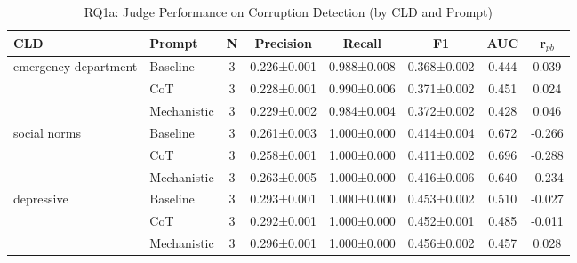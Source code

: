 \begin{table}[htbp]
\centering
\caption{RQ1a: Judge Performance on Corruption Detection (by CLD and Prompt)}
\label{tab:rq1a_main}
\begin{tabular}{llcccccc}
\toprule
\textbf{CLD} & \textbf{Prompt} & \textbf{N} & \textbf{Precision} & \textbf{Recall} & \textbf{F1} & \textbf{AUC} & \textbf{r$_{pb}$} \\
\midrule
emergency department & Baseline & 3 & 0.226±0.001 & 0.988±0.008 & 0.368±0.002 & 0.444 & 0.039 \\
 & CoT & 3 & 0.228±0.001 & 0.990±0.006 & 0.371±0.002 & 0.451 & 0.024 \\
 & Mechanistic & 3 & 0.229±0.002 & 0.984±0.004 & 0.372±0.002 & 0.428 & 0.046 \\
\midrule
social norms & Baseline & 3 & 0.261±0.003 & 1.000±0.000 & 0.414±0.004 & 0.672 & -0.266 \\
 & CoT & 3 & 0.258±0.001 & 1.000±0.000 & 0.411±0.002 & 0.696 & -0.288 \\
 & Mechanistic & 3 & 0.263±0.005 & 1.000±0.000 & 0.416±0.006 & 0.640 & -0.234 \\
\midrule
depressive & Baseline & 3 & 0.293±0.001 & 1.000±0.000 & 0.453±0.002 & 0.510 & -0.027 \\
 & CoT & 3 & 0.292±0.001 & 1.000±0.000 & 0.452±0.001 & 0.485 & -0.011 \\
 & Mechanistic & 3 & 0.296±0.001 & 1.000±0.000 & 0.456±0.002 & 0.457 & 0.028 \\
\midrule
\bottomrule
\end{tabular}
\end{table}